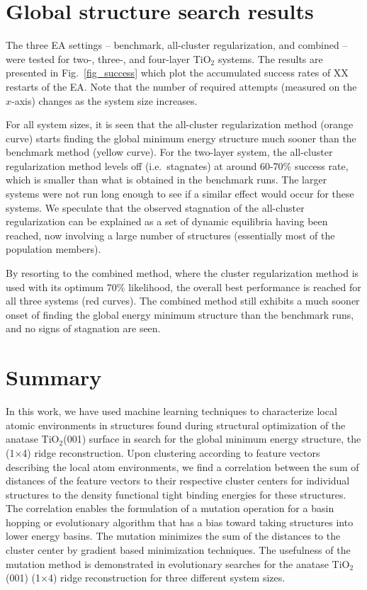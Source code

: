 \documentclass[aip,amsmath,amssymb,reprint]{revtex4-1}
\begin{document}
\section{Global structure search results}


The three EA settings -- benchmark, all-cluster regularization, and
combined -- were tested for two-, three-, and four-layer TiO$_2$
systems. The results are presented in Fig.\  \ref{fig_success} which
plot the accumulated success rates of XX restarts of the EA. Note that
the number of required attempts (measured on the $x$-axis) changes as
the system size increases.

For all system sizes, it is seen that the all-cluster regularization
method (orange curve) starts finding the global minimum energy
structure much sooner than the benchmark method (yellow curve). For the two-layer system,
the all-cluster regularization method levels off (i.e.\ stagnates) at around 60-70\%
success rate, which is smaller than what is obtained in the benchmark
runs. The larger systems were not run long enough to see if a similar
effect would occur for these systems. We speculate that the observed
stagnation of the all-cluster regularization can be explained as a set
of dynamic equilibria having been reached, now involving a large
number of structures (essentially most of the population members).

By resorting to the combined method, where the cluster regularization
method is used with its optimum 70\% likelihood, the overall best
performance is reached for all three systems (red curves). The
combined method still exhibits a much sooner onset of finding the global energy
minimum structure than the benchmark runs, and no signs of stagnation are seen.


\section{Summary}
In this work, we have used machine learning techniques to characterize
local atomic environments in structures found during structural
optimization of the anatase TiO$_2$(001) surface in search for the
global minimum energy structure, the (1$\times$4) ridge
reconstruction. Upon clustering according to feature vectors
describing the local atom environments, we find a correlation between
the sum of distances of the feature vectors to their respective
cluster centers for individual structures to the density functional
tight binding energies for these structures. The correlation enables
the formulation of a mutation operation for a basin hopping or
evolutionary algorithm that has a bias toward taking structures
into lower energy basins. The mutation minimizes the sum of the
distances to the cluster center by gradient based minimization
techniques. The usefulness of the mutation method is demonstrated in
evolutionary searches for the anatase TiO$_2$(001) (1$\times$4) ridge
reconstruction for three different system sizes.
\end{document}
